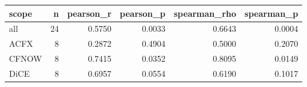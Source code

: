 \begin{tabular}{lrrrrr}
\toprule
scope &  n &  pearson\_r &  pearson\_p &  spearman\_rho &  spearman\_p \\
\midrule
  all & 24 &     0.5750 &     0.0033 &        0.6643 &      0.0004 \\
 ACFX &  8 &     0.2872 &     0.4904 &        0.5000 &      0.2070 \\
CFNOW &  8 &     0.7415 &     0.0352 &        0.8095 &      0.0149 \\
 DiCE &  8 &     0.6957 &     0.0554 &        0.6190 &      0.1017 \\
\bottomrule
\end{tabular}

